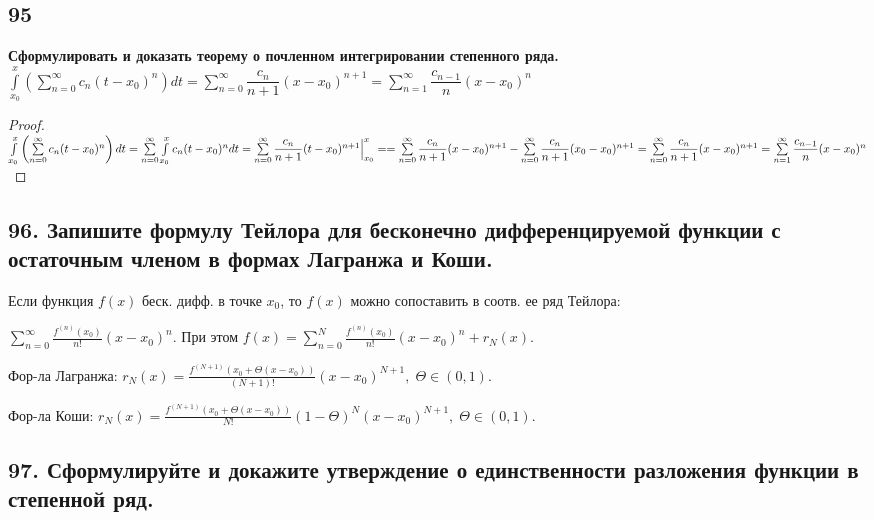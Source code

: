 \documentclass[a4paper, fleqn]{article}
\begin{document}
    \subsection*{95}
	\textbf{ Сформулировать и доказать теорему о почленном интегрировании степенного ряда.} \\[5 pt]
	$\int\limits_{x_0}^x \left( \sum\limits_{n = 0}^{\infty} c_n(t - x_0)^n \right) dt = 
	\sum\limits_{n = 0}^{\infty} \dfrac{c_n}{n + 1}(x - x_0)^{n + 1} = 
	\sum\limits_{n = 1}^{\infty} \dfrac{c_{n - 1}}n (x - x_0)^n$
	\begin{proof}
	$\int\limits_{x_0}^x \left( \sum\limits_{n = 0}^{\infty} c_n(t - x_0)^n \right) dt = 
	\sum\limits_{n = 0}^{\infty} \int\limits_{x_0}^x c_n(t - x_0)^n dt = 
	\sum\limits_{n = 0}^{\infty} \dfrac{c_n}{n + 1}(t - x_0)^{n + 1}\Big|_{x_0}^x = \\[3 pt]
	= \sum\limits_{n = 0}^{\infty} \dfrac{c_n}{n + 1}(x - x_0)^{n + 1} - 
	\sum\limits_{n = 0}^{\infty} \dfrac{c_n}{n + 1}(x_0 - x_0)^{n + 1} = 
	\sum\limits_{n = 0}^{\infty} \dfrac{c_n}{n + 1}(x - x_0)^{n + 1} = \sum\limits_{n = 1}^{\infty} \dfrac{c_{n - 1}}n (x - x_0)^n$
	\end{proof}    
    
    \subsection*{96. Запишите формулу Тейлора для бесконечно дифференцируемой функции с остаточным членом в формах Лагранжа и Коши.}
    
    Если функция $f(x)$ беск. дифф. в точке $x_0$, то $f(x)$ можно сопоставить в соотв. ее ряд Тейлора:
    
    $\displaystyle \sum_{n = 0}^{\infty} \frac{f^{(n)} (x_0)}{n!} (x - x_0)^n.$ При этом $f(x) = \displaystyle \sum_{n = 0}^{N} \frac{f^{(n)} (x_0)}{n!} (x - x_0)^n + r_N (x).$
    
    Фор-ла Лагранжа: $r_N(x) = \frac{ f^{(N + 1)} (x_0 + \Theta(x - x_0))}{(N + 1)!} (x - x_0)^{N + 1}, \; \Theta \in (0, 1). $
    
    Фор-ла Коши: $r_N(x) = \frac{f^{(N + 1)} (x_0 + \Theta(x - x_0))}{N!} (1 - \Theta)^N (x - x_0)^{N + 1}, \; \Theta \in (0, 1).$
        
        
    
    \subsection*{97. Сформулируйте и докажите утверждение о единственности разложения функции в степенной ряд.}
    
\end{document}
